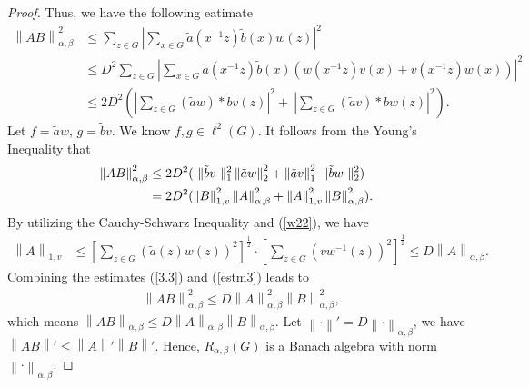 \documentclass[preprint,11pt]{elsarticle}
\numberwithin{equation}{section}
\begin{document}
\begin{proof}
		Thus, we have the following eatimate
		\begin{align*}
			\left \| AB \right \| _{\alpha,\beta}^{2}%
			&\le \sum_{z\in G } |\sum_{x\in G} \tilde {a}(x^{-1}z)\tilde {b}(x)w(z)  |^2\\
			&\le D^2\sum_{z\in G } |\sum_{x\in G} \tilde {a}(x^{-1}z)\tilde {b}(x)(w(x^{-1}z)v(x)+v(x^{-1}z)w(x))  |^2\\
			&\le 2D^2 (  |\sum_{z\in G }\left ( \tilde {a}w \right ) \ast   \tilde {b}v  (z) |^2+\ |\sum_{z\in G }\left ( \tilde {a}v \right ) \ast   \tilde {b}w (z) |^2 ).
		\end{align*}
		Let $f=\tilde{a}w$, $g=\tilde{b}v$. We know $f,g\in \ell^2(G)$. It follows from the Young's Inequality that 
		\begin{align}\label{3.3}
			\left \| AB \right \| _{\alpha,\beta}^{2}&\leq 2D^2(\ \| \tilde{b}v\ \|_1^2 \left \| \tilde{a}w \right \|_2^2 + \left \| \tilde{a}v \right \|_1^2 \ \| \tilde{b}w \ \|_2^2)\notag \\
			&= 2D^2( \left \| B\right \|_{1,v}^{2}\left \| A \right \|_{\alpha,\beta}^{2} +\left \| A \right \|_{1,v}^{2}\left \| B \right \|_{\alpha,\beta}^{2} ) . 
		\end{align}
		By utilizing the Cauchy-Schwarz Inequality and (\ref{w22}), we have
		\begin{align}\label{estm3}
			\left \| A \right \|_{1,v}
			&\le  [\sum_{z\in G} (\tilde{a}(z)w(z))^{2} ]^{\frac{1}{2}}\cdot[\sum_{z\in G} \left(vw^{-1}(z) \right)^2 ]^{\frac{1}{2}}\le D \left \| A \right \| _{\alpha,\beta }.
		\end{align}
		Combining the estimates (\ref{3.3}) and (\ref{estm3})  leads to
		\begin{align*}
			&\left \| AB \right \|_{\alpha,\beta }^2 
			\le D\left \| A \right \|_{\alpha,\beta}^2\left \| B \right \|_{\alpha,\beta }^2,
		\end{align*}
		which means $\left \| AB \right \|_{\alpha,\beta }\le D\left \| A \right \|_{\alpha,\beta } \left \| B \right \|_{\alpha,\beta } $.
		Let $\left \| \cdot  \right \|'=D \left \| \cdot  \right \| _{\alpha,\beta }$, we have  $\left \| AB  \right \|'\le \left \| A \right \|'\left \| B  \right \|'$. Hence, $R_{\alpha,\beta }(G)$  is a Banach algebra with norm $\left \| \cdot \right \|_{\alpha,\beta }$.
		
	\end{proof}
\end{document}
